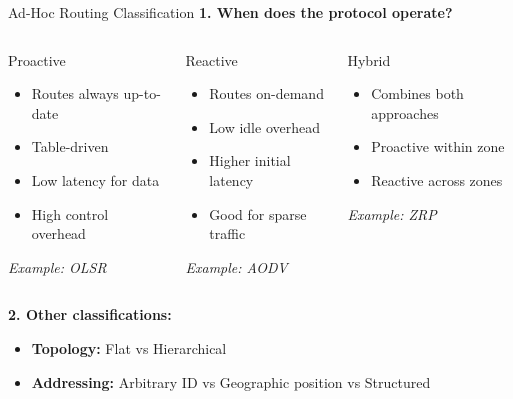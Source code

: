 \documentclass[aspectratio=169,11pt]{beamer}
\begin{document}
\begin{frame}{Ad-Hoc Routing Classification}
    \textbf{1. When does the protocol operate?}
    
    \vspace{0.3cm}
    \begin{columns}
        \begin{block}{Proactive}
            \begin{itemize}
                \item Routes always up-to-date
                \item Table-driven
                \item Low latency for data
                \item High control overhead
            \end{itemize}
            \textit{Example: OLSR}
        \end{block}
        
        \begin{block}{Reactive}
            \begin{itemize}
                \item Routes on-demand
                \item Low idle overhead
                \item Higher initial latency
                \item Good for sparse traffic
            \end{itemize}
            \textit{Example: AODV}
        \end{block}
        
        \begin{block}{Hybrid}
            \begin{itemize}
                \item Combines both approaches
                \item Proactive within zone
                \item Reactive across zones
            \end{itemize}
            \textit{Example: ZRP}
        \end{block}
    \end{columns}
    
    \vspace{0.3cm}
    \textbf{2. Other classifications:}
    \begin{itemize}
        \item \textbf{Topology:} Flat vs Hierarchical
        \item \textbf{Addressing:} Arbitrary ID vs Geographic position vs Structured
    \end{itemize}
\end{frame}
\end{document}
